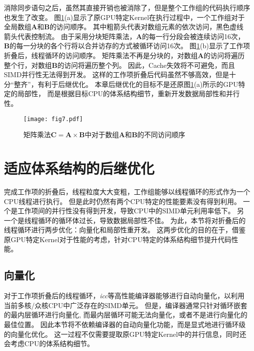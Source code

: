 消除同步语句之后，虽然其直接开销也被消除了，但是整个工作组的代码执行顺序也发生了改变。
图\ref{access}(a)显示了原GPU特定Kernel在执行过程中，一个工作组对于全局数组$\bm{A}$和$\bm{B}$的访问顺序。
其中粗箭头代表对数组元素的依次访问，黑色虚线箭头代表控制流。
由于采用分块矩阵乘法，$\bm{A}$的每一行分段会被连续访问16次，
$\bm{B}$的每一分块的各个行将以合并访存的方式被循环访问16次。
图\ref{access}(b)显示了工作项折叠后，线程循环的访问顺序。
矩阵乘法不再是分块的，对数组$\bm{A}$的访问将遍历整个行，对数组$\bm{B}$的访问将遍历整个列。
因此，Cache失效将不可避免，而且SIMD并行性无法得到开发。
这样的工作项折叠后代码虽然不够高效，但是十分``整齐''，有利于后继优化。
本章后继优化的目标不是还原图\ref{access}(a)所示的GPU特定的局部性，
而是根据目标CPU的体系结构细节，重新开发数据局部性和并行性。


\begin{figure}[htb]
\centering
\texttt{[image: fig7.pdf]}
\caption{矩阵乘法$\bm{C}=\bm{A}\times \bm{B}$中对于数组$\bm{A}$和$\bm{B}$的不同访问顺序}
\label{access}
\end{figure}


\section{适应体系结构的后继优化}
\label{postoptimizationsec}
完成工作项的折叠后，线程粒度大大变粗，工作组能够以线程循环的形式作为一个CPU线程进行执行。
但是此时仍然有两个CPU特定的性能要素没有得到利用。
一个是工作项间的并行性没有得到开发，导致CPU中的SIMD单元利用率低下。
另一个是线程循环的循环体过长，导致数据局部性不佳。
为此，本节将对折叠后的线程循环进行两步优化：向量化和局部性重开发。
这两步优化的目的在于，借鉴原GPU特定Kernel对于性能的考虑，针对CPU特定的体系结构细节提升代码性能。

\subsection{向量化}
对于工作项折叠后的线程循环，{\em icc}等高性能编译器能够进行自动向量化，以利用当前多核/众核CPU中广泛存在的SIMD单元。
但是，编译器通常只针对循环嵌套的最内层循环进行向量化,
而最内层循环可能无法向量化，或者不是进行向量化的最佳位置。
因此本节将不依赖编译器的自动向量化功能，而是显式地进行循环级的向量化优化。
这一过程不仅需要提取原GPU特定Kernel中的并行信息，同时还会考虑CPU的体系结构细节。

